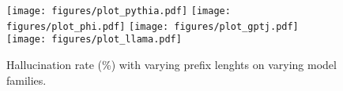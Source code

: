 \begin{figure}[t]
    \centering
    \texttt{[image: figures/plot\_pythia.pdf]}
    \label{fig:compare1}
    \texttt{[image: figures/plot\_phi.pdf]}
    \label{fig:compare2}
    \texttt{[image: figures/plot\_gptj.pdf]}
    \label{fig:compare3}
    \texttt{[image: figures/plot\_llama.pdf]}
    \label{fig:compare4}
    \label{fig:enter-label}
        \caption{Hallucination rate (\%) with varying prefix lenghts on varying model families. }
\end{figure}